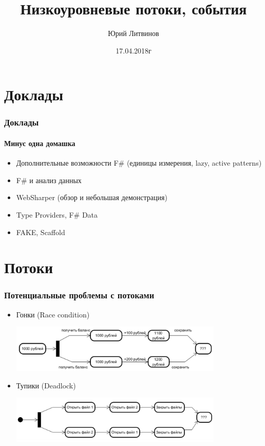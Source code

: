 \documentclass[xetex,mathserif,serif]{beamer}
\title{Низкоуровневые потоки, события}
\author{Юрий Литвинов}
\date{17.04.2018г}
\begin{document}
	\frame{\titlepage}

	\section{Доклады}

	\begin{frame}
		\frametitle{Доклады}
		\framesubtitle{Минус одна домашка}
		\begin{itemize}
			\item Дополнительные возможности F\# (единицы измерения, lazy, active patterns)
			\item F\# и анализ данных
			\item WebSharper (обзор и небольшая демонстрация)
			\item Type Providers, F\# Data
			\item FAKE, Scaffold
		\end{itemize}
	\end{frame}

	\section{Потоки}

	\begin{frame}
		\frametitle{Потенциальные проблемы с потоками}
		\begin{itemize}
			\item Гонки (Race condition)
				\begin{center}
					\includegraphics[width=0.8\textwidth]{raceCondition.png}
				\end{center}
				\vspace{1cm}
			\item Тупики (Deadlock)
				\begin{center}
					\includegraphics[width=0.8\textwidth]{deadlock.png}
				\end{center}
		\end{itemize}
	\end{frame}
\end{document}
